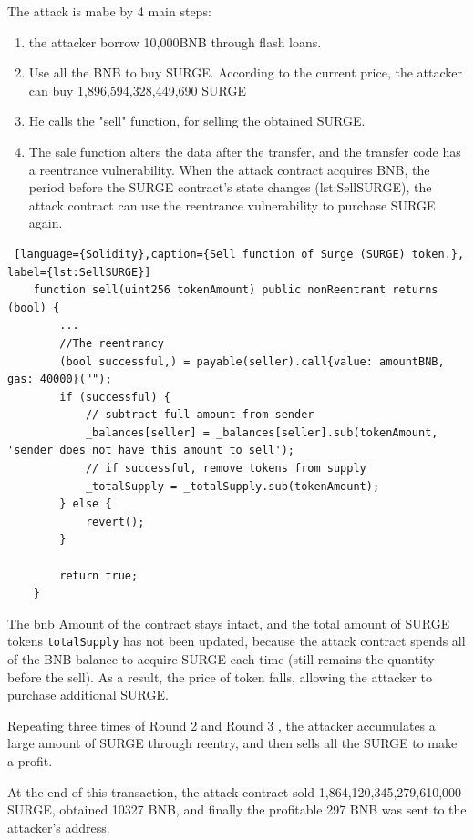 The attack is mabe by 4 main steps:
\begin{enumerate}
    \item the attacker borrow  10,000BNB through flash loans.
    \item Use all the BNB to buy SURGE. According to the current price, 
    the attacker can buy 1,896,594,328,449,690 SURGE
    \item He calls the "sell" function, for selling the obtained SURGE.
    \item The sale function alters the data after the transfer, and the transfer code has a reentrance vulnerability.
    When the attack contract acquires BNB, the period before the SURGE contract's state changes 
    (\refname{lst:SellSURGE}), the attack contract can use the reentrance 
    vulnerability to purchase SURGE again.
\end{enumerate}

\begin{lstlisting} [language={Solidity},caption={Sell function of Surge (SURGE) token.}, label={lst:SellSURGE}]
    function sell(uint256 tokenAmount) public nonReentrant returns (bool) {
        ...
        //The reentrancy 
        (bool successful,) = payable(seller).call{value: amountBNB, gas: 40000}(""); 
        if (successful) {
            // subtract full amount from sender
            _balances[seller] = _balances[seller].sub(tokenAmount, 'sender does not have this amount to sell');
            // if successful, remove tokens from supply
            _totalSupply = _totalSupply.sub(tokenAmount);
        } else {
            revert();
        }
        
        return true;
    }
\end{lstlisting}


The bnb Amount of the contract stays intact, and the total amount of SURGE tokens \texttt{totalSupply}  
has not been updated, because the attack contract spends all of the BNB balance to acquire SURGE
 each time (still remains the quantity before the sell).
As a result, the price of token falls, allowing the attacker to purchase additional SURGE. 

Repeating three times of Round 2 and Round 3 , the attacker accumulates a large amount of SURGE through reentry, and then sells all the SURGE to make a profit.

At the end of this transaction, the attack contract sold 1,864,120,345,279,610,000 SURGE, 
obtained 10327 BNB, and finally the profitable 297 BNB was sent to the attacker's address.

